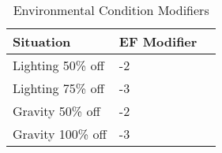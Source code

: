 \begin{table}[hb]
\caption{Environmental Condition Modifiers}
\centering
	\begin{tabular}{||l||l|l||} \hline
	Situation			& EF Modifier	\\ \hline
	Lighting 50\% off	& -2			\\
	Lighting 75\% off	& -3			\\
	Gravity 50\% off	& -2			\\		   
	Gravity 100\% off	& -3			\\ \hline
	\end{tabular}
\end{table}
